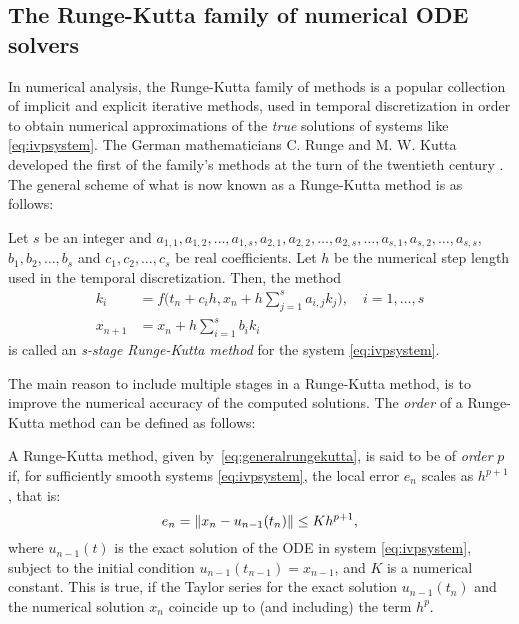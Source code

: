 \subsection{The Runge-Kutta family of numerical ODE solvers}
\label{sub:the_runge_kutta_family_of_numerical_methods}

In numerical analysis, the Runge-Kutta family of methods is a popular
collection of implicit and explicit iterative methods, used in temporal
discretization in order to obtain numerical approximations of the \emph{true}
solutions of systems like \eqref{eq:ivpsystem}. The German mathematicians C.
Runge and M. W. Kutta developed the first of the family's methods at the turn
of the twentieth century \parencite[p.134]{hairer1993solving}. The general
scheme of what is now known as a Runge-Kutta method is as follows: \\

\begin{defn}
    \label{def:generalrungekutta}
    Let $s$ be an integer and $a_{1,1},a_{1,2},\ldots,a_{1,s},a_{2,1},
    a_{2,2},\ldots,a_{2,s},\ldots,a_{s,1},a_{s,2},\ldots,a_{s,s}$,
    $b_{1},b_{2},\ldots,b_{s}$ and $c_{1},c_{2},\ldots,c_{s}$ be real
    coefficients. Let $h$ be the numerical step length used in the
    temporal discretization. Then, the method
\begin{equation}
    \label{eq:generalrungekutta}
    \begin{aligned}
        k_{i} &= f\bigg(t_{n}+c_{i}h,x_{n}+
                h\sum\limits_{j=1}^{s}a_{i,j}k_{j}\bigg),\quad{}i=1,\ldots,s\\
        x_{n+1} &= x_{n} + h\sum\limits_{i=1}^{s}b_{i}k_{i}
    \end{aligned}
\end{equation}
is called an \emph{s-stage Runge-Kutta method} for the system
\eqref{eq:ivpsystem}.
\end{defn}

The main reason to include multiple stages in a Runge-Kutta method,
is to improve the numerical accuracy of the computed solutions.
The \emph{order} of a Runge-Kutta method can be defined as follows:\\

\begin{defn}
    \label{def:rungekuttaorder}
    A Runge-Kutta method, given by~\cref{eq:generalrungekutta}, is
    said to be of \emph{order} $p$ if, for sufficiently smooth systems
    \eqref{eq:ivpsystem}, the local error $e_{n}$ scales as $h^{p+1}$, that is:
    \begin{equation}
        \label{eq:rungekuttaorder}
        e_{n}=\norm{x_{n}-u_{n-1}(t_{n})} \leq Kh^{p+1},
    \end{equation}
    where $u_{n-1}(t)$ is the exact solution of the ODE in system
    \eqref{eq:ivpsystem}, subject to the initial condition
    $u_{n-1}(t_{n-1})=x_{n-1}$, and $K$ is a numerical constant. This is true,
    if the Taylor series for the exact solution $u_{n-1}(t_{n})$ and the
    numerical solution $x_{n}$ coincide up to (and including) the term $h^p$.
\end{defn}

